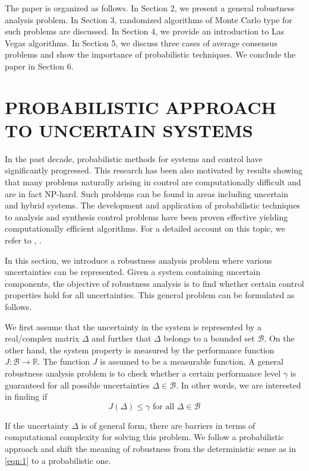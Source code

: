 \documentclass[12pt]{article}
\begin{document}
		\par
		The paper is organized as follows. In Section 2, we present a general robustness analysis problem. In Section 3, randomized algorithms of Monte Carlo type for such problems are discussed. In Section 4, we provide an introduction to Las Vegas algorithms. In Section 5, we discuss three cases of average consensus problems and show the importance of probabilistic techniques. We conclude the paper in Section 6.
		\par
		

		\section{PROBABILISTIC APPROACH TO UNCERTAIN SYSTEMS}
		In the past decade, probabilistic methods for systems and control have significantly progressed. This research has been also motivated by results showing that many problems naturally arising in control are computationally difficult and are in fact NP-hard. Such problems can be found in areas including uncertain and hybrid systems. The development and application of probabilistic techniques to analysis and synthesis control problems have been proven effective yielding computationally efficient algorithms. For a detailed account on this topic, we refer to \cite{bib23}, \cite{bib26}.
		\par
		In this section, we introduce a robustness analysis problem  where various uncertainties can be represented. Given a system containing uncertain components, the objective of robustness analysis is to find whether certain control properties hold for all uncertainties. This general problem can be formulated as follows.
		\par
		We first assume that the uncertainty in the system is represented by a real/complex matrix $\Delta$ and further that $\Delta$ belongs to a bounded set $\mathscr{B}$. On the other hand, the system property is measured by the performance function $J : \mathscr{B} \rightarrow \mathbb{R}$. The function $J$ is assumed  to be a measurable function. A general robustness analysis problem is to check whether a certain performance level $\gamma$ is guaranteed for all possible uncertainties $\Delta \in \mathscr{B}$. In other words,  we are interested in finding if 
		\begin{equation}
			\label{eqn:1}
			J(\Delta ) \leqslant \gamma \textrm{ for all } \Delta \in \mathscr{B}
		\end{equation}
		\par
		If the uncertainty $\Delta$ is of general form, there are barriers in terms of computational complexity for solving this problem. We follow a probabilistic approach and shift the meaning of robustness from the deterministic sense as in \ref{eqn:1} to a probabilistic one.
\end{document}
